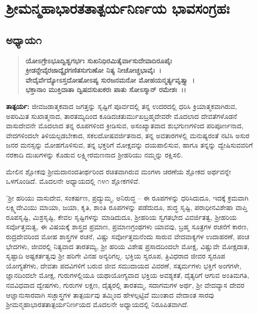 

\begin{center}
\end{center}

\begin{center}
\end{center}

\chapter{ ಶ‍್ರೀಮನ್ಮಹಾಭಾರತತಾತ್ಪರ್ಯನಿರ್ಣಯ ಭಾವಸಂಗ್ರಹಃ}

\section*{ಅಧ್ಯಾಯ\enginline{-}೧}

\begin{verse}
\textbf{ಯೋಽಗ್ರೇಽಭೂದ್ವಿಶ್ವಗರ್ಭಃ ಸುಖನಿಧಿರಮಿತೈರ್ವಾಸುದೇವಾದಿರೂಪೈಃ }\\\textbf{ಕ್ರೀಡನ್ದೇವೈರಜಾದ್ಯೈರಗಣಿತಸುಗುಣೋ ನಿತ್ಯ ನೀಚೋಚ್ಚಭಾವೈಃ~।} \\\textbf{ವೇದೈರ್ವೆದ್ಯೋಽಸ್ತದೋಷೋಽಪ್ಯ ಸುರಜನಮನೋ ಮೋಹಯನ್ಮರ್ತ್ಯವೃತ್ತ್ಯಾ~।} \\\textbf{ಭಕ್ತಾನಾಂ ಮುಕ್ತಿದಾತಾ ದ್ವಿಷದಸುಖಕರಃ ಪಾತು ಸೋಽಸ್ಮಾನ್ ರಮೇಶಃ~।।}
\end{verse}

\textbf{ತಾತ್ಪರ್ಯ:\enginline{-} }ಜೀವಜಡಾತ್ಮಕವಾದ ಜಗತ್ತನ್ನು ಸೃಷ್ಟಿಗೆ ಪೂರ್ವದಲ್ಲಿ ತನ್ನ ಉದರದಲ್ಲಿ ಧರಿಸಿ ಕ್ರಿಯಾತ್ಮಕವಾಗಿರುವ, ಅಪರಿಮಿತ ಸುಖಾತ್ಮನಾದ, ತಾರತಮ್ಯದಿಂದ ಕೂಡಿದ\break ಚತುರ್ಮುಖಬ್ರಹ್ಮದೇವರೇ ಮೊದಲಾದ ದೇವತೆಗಳೊಡನೆ ವಾಸುದೇವನೇ ಮೊದಲಾದ ತನ್ನ ರೂಪಗಳಿಂದ ಕ್ರೀಡಿಸುವ, ಅಸಂಖ್ಯಾತವಾದ ಶುಭಗುಣಗಳಿಂದ ಪರಿಪೂರ್ಣನಾದ, ವೇದಗಳಿಂದಲೇ ತಿಳಿಯಲ್ಪಡಬೇಕಾದ, ಸಕಲದೋಷವರ್ಜಿತನಾದ, ತನ್ನ ಅವತಾರಗಳಲ್ಲಿ ಮನುಷ್ಯರಂತೆ ನಟಿಸಿ ಅಸುರ ಜನರ ಮನಸ್ಸನ್ನು ಮೋಹಗೊಳಿಸುವ, ತನ್ನ ಭಕ್ತರಿಗೆ ಮೋಕ್ಷವನ್ನು ದಯಪಾಲಿಸುವ, ಹಾಗೂ ತನ್ನನ್ನು ದ್ವೇಷಿಸುವವರಿಗೆ ನರಕಾದಿ ದುಃಖಗಳನ್ನು ಕೊಡುವ ಲಕ್ಷ್ಮೀರಮಣನಾದ ಶ‍್ರೀಹರಿಯು ನಮ್ಮನ್ನು ರಕ್ಷಿಸಲಿ.

ಮೇಲಿನ ಶ್ಲೋಕವು ಶ‍್ರೀಮದಾನಂದತೀರ್ಥರಿಂದ ರಚಿತವಾಗಿರುವ ಮಂಗಳಾ ಚರಣೆಯ ಶ್ಲೋಕದ ಅರ್ಥವನ್ನೇ ಒಳಗೊಂಡಿದೆ. ಮೊದಲನೇ ಅಧ್ಯಾಯದಲ್ಲಿ ೧೪೧ ಶ್ಲೋಕಗಳಿವೆ.

'ಶ‍್ರೀ ಹರಿಯು ವಾಸುದೇವ, ಸಂಕರ್ಷಣ, ಪ್ರದ್ಯುಮ್ಮ, ಅನಿರುದ್ಧ – ಈ ರೂಪಗಳನ್ನು ಧರಿಸಿದುದೂ, ಇದಕ್ಕೆ ಕ್ರಮವಾಗಿ ಲಕ್ಷ್ಮಿದೇವಿಯು ಮಾಯಾ, ಜಯಾ, ಕೃತಿ, ಶಾಂತಿ ರೂಪಗಳನ್ನು ಪಡೆದುದೂ, ಶುದ್ಧ ಸೃಷ್ಟಿ, ಪರಾಧೀನವಿಶೇಷಾ ವಾಪ್ತಿ ರೂಪಸೃಷ್ಟಿ, ಮಿಶ್ರಸೃಷ್ಟಿ, ಕೇವಲ ಸೃಷ್ಟಿಗಳನ್ನು ಮಾಡಿದುದೂ, ಶ‍್ರೀಹರಿಯ ಸ್ವಗತಭೇದ ವಿವರ್ಜಿತತ್ವ, ಶ‍್ರೀಹರಿಯ ಸರ್ವೊತ್ತಮತ್ವ, ಈ ವಿಷಯಕ್ಕೆ ಶಾಸ್ತ್ರದ ಪ್ರಮಾಣ, ಪ್ರಮಾಣಗ್ರಂಥಗಳು ಯಾವವು, ಬ್ರಹ್ಮ ಸೂತ್ರಗಳ ರಚನೆಗೆ ಕಾರಣ, ರುದ್ರದೇವರಿಂದ ಮೋಹ ಶಾಸ್ತ್ರಗಳ ರಚನೆ, ವಿಷ್ಣು ಸರ್ವೋತ್ತಮನೆಂದು ಸಾರುವ ವೇದವಾಕ್ಯಗಳ ಉದಾಹರಣೆ, ಪಂಚ ಭೇದಗಳು, ಜೀವರಲ್ಲಿ ನಿತ್ಯವಾದ ತಾರತಮ್ಯ, ಶ‍್ರೀ ಹರಿಯ ವಿಶೇಷ ಪ್ರಸಾದದಿಂದಲೇ ಮೋಕ್ಷ, ವಿಷ್ಣುವೇ ಮೋಕ್ಷದಾತ, ಸೃಷ್ಟಾದಿ ಅಷ್ಟಕರ್ತತ್ವವು ಶ‍್ರೀ ಹರಿಗೇ ವಿನಹ ಅನ್ಯರಿಗಲ್ಲ. ಭಕ್ತಿಯ ಸ್ವರೂಪ, ತ್ರಿವಿಧರಾದ ಜೀವರ ಸ್ವರೂಪ ಯೋಗ್ಯತೆಗಳು, ದೇವತಾ ಪದವಿಗಳಿಗೆ ಬರುವ ಜೀವ ಸಮುದಾಯದ ವಿವರಣೆ, ಸತ್ಕರ್ಮಗಳು ಭಕ್ತಿಗೆ ಅಂಗಗಳೇ, ಜ್ಞಾನದಿಂದಲೇ ಮೋಕ್ಷ, ಗುರುಗಳಲ್ಲಿಯೂ ಯಥಾಯೋಗ್ಯವಾದ ಭಕ್ತಿಯ ಅವಶ್ಯಕತೆ, ದೈತ್ಯರಿಗೆ ಆಗುವ ಅಂತಿಮಗತಿ, ನವವಿಧವಾದ ದ್ವೇಷಗಳು, ಗುರುಗಳ ಲಕ್ಷಣ, ದೈತ್ಯರಲ್ಲಿ ತಾರತಮ್ಮ, ಸದಾಗಮಗಳ ಅರ್ಥ, ಶ‍್ರೀ ವೇದವ್ಯಾಸ ದೇವರ ಆಜ್ಞಾನುಸಾರವಾಗಿ ಸಚ್ಛಾಸ್ತ್ರಗಳ ತಾತ್ಪರ್ಯವು ತಮ್ಮಿಂದ ಹೇಳಲ್ಪಟ್ಟಿವೆ ಮುಂತಾದ ವೇದಾಂತ ಸಾರವು ಶ‍್ರೀಮನ್ಮಹಾಭಾರತತಾತ್ಪರ್ಯನಿರ್ಣಯದ ಮೊದಲನೇ ಅಧ್ಯಾಯದಲ್ಲಿ ನಿರೂಪಿತ\-ವಾಗಿದೆ.


